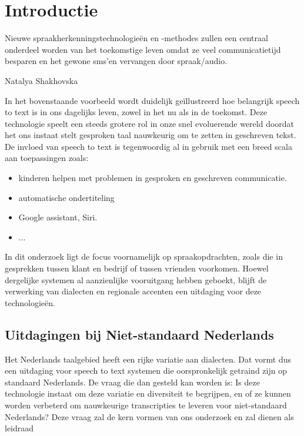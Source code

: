 
\section{Introductie}%
\label{sec:introductie}
\epigraph{Nieuwe spraakherkenningstechnologieën en -methodes zullen een centraal onderdeel worden van 
    het toekomstige leven omdat ze veel communicatietijd besparen en het gewone sms'en 
    vervangen door spraak/audio.}{Natalya Shakhovska}
    
In het bovenstaande voorbeeld wordt duidelijk geïllustreerd hoe belangrijk speech to text is in ons dagelijks leven, zowel in het nu als in de toekomst. Deze technologie speelt een steeds grotere rol in onze snel evoluerende wereld doordat het ons instaat stelt gesproken taal nauwkeurig om te zetten in geschreven tekst. De invloed van speech to text is tegenwoordig al in gebruik met een breed scala aan toepassingen zoals:
\begin{itemize}
    \item kinderen helpen met problemen in gesproken en geschreven communicatie.\autocite{Kambouri2023}
    \item automatische ondertiteling
    \item Google assistant, Siri.
    \item ...
\end{itemize}

In dit onderzoek ligt de focus voornamelijk op spraakopdrachten, zoals die in gesprekken tussen klant en bedrijf of tussen vrienden voorkomen. Hoewel dergelijke systemen al aanzienlijke vooruitgang hebben geboekt, blijft de verwerking van dialecten en regionale accenten een uitdaging voor deze technologieën.

\subsection{Uitdagingen bij Niet-standaard Nederlands}
Het Nederlands taalgebied heeft een rijke variatie aan dialecten. Dat vormt dus een uitdaging voor speech to text systemen die oorspronkelijk getraind zijn op standaard Nederlands. De vraag die dan gesteld kan worden is: Is deze technologie instaat om deze variatie en diversiteit te begrijpen, en of ze kunnen worden verbeterd om nauwkeurige transcripties te leveren voor niet-standaard Nederlands?
Deze vraag zal de kern vormen van ons onderzoek en zal dienen als leidraad

